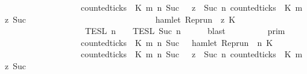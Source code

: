\begin{isabellebody}
\ \ \ \ \ \ \ \ \ \ \ \ \ \ \ \ {\isasyminter}\ {\isacharbraceleft}{\isasymrho}{\isachardot}\ {\isacharparenleft}counted{\isacharunderscore}ticks\ {\isasymrho}\ K\ m\ n\ {\isacharparenleft}Suc\ {}{\isacharparenright}\ {\isasymor}\ {\isacharparenleft}{\isasymforall}z\ {\isasymge}\ Suc\ n{\isachardot}\ {\isacharparenleft}counted{\isacharunderscore}ticks\ {\isasymrho}\ K\ m\ z\ {\isacharparenleft}Suc\ {}{\isacharparenright}{\isacharparenright}\isanewline
\ \ \ \ \ \ \ \ \ \ \ \ \ \ \ \ \ \ \ \ \ \ \ \ \ \ \ \ {\isasymlongrightarrow}\ hamlet\ {\isacharparenleft}{\isacharparenleft}Rep{\isacharunderscore}run\ {\isasymrho}{\isacharparenright}\ z\ K\ {\isacharbraceright}\isanewline
\ \ \ \ \ \ \ \ \ \ \ \ \ \ \ \ {\isasyminter}\ {\isasymlbrakk}{\isasymlbrakk}\ {\isasymPsi}\ {\isasymrbrakk}{\isasymrbrakk}\isactrlsub T\isactrlsub E\isactrlsub S\isactrlsub L\isactrlbsup {\isasymge}\ n\isactrlesup \ {\isasyminter}\ {\isasymlbrakk}{\isasymlbrakk}\ {\isasymPhi}\ {\isasymrbrakk}{\isasymrbrakk}\isactrlsub T\isactrlsub E\isactrlsub S\isactrlsub L\isactrlbsup {\isasymge}\ Suc\ n\isactrlesup {\isacartoucheclose}\isanewline
\ \ \ \ \isamarkupfalse%
\ blast\isanewline
\ \ \isamarkupfalse%
\ \isamarkupfalse%
\ {\isacartoucheopen}{\isachardot}{\isachardot}{\isachardot}\ {\isacharequal}\ {\isasymlbrakk}{\isasymlbrakk}\ {\isasymGamma}\ {\isasymrbrakk}{\isasymrbrakk}\isactrlsub p\isactrlsub r\isactrlsub i\isactrlsub m\ \isanewline
\ \ \ \ \ \ \ \ \ \ \ \ \ \ \ \ {\isasyminter}\ {\isacharbraceleft}{\isasymrho}{\isachardot}\ {\isacharparenleft}{\isasymnot}counted{\isacharunderscore}ticks\ {\isasymrho}\ K\ m\ n\ {\isacharparenleft}Suc\ {}{\isacharparenright}\ {\isasymor}\ hamlet\ {\isacharparenleft}{\isacharparenleft}Rep{\isacharunderscore}run\ {\isasymrho}{\isacharparenright}\ n\ K\isanewline
\ \ \ \ \ \ \ \ \ \ \ \ \ \ \ \ {\isasyminter}\ {\isacharbraceleft}{\isasymrho}{\isachardot}\ {\isacharparenleft}counted{\isacharunderscore}ticks\ {\isasymrho}\ K\ m\ n\ {\isacharparenleft}Suc\ {}{\isacharparenright}\ {\isasymor}\ {\isacharparenleft}{\isasymforall}z\ {\isasymge}\ Suc\ n{\isachardot}\ {\isacharparenleft}counted{\isacharunderscore}ticks\ {\isasymrho}\ K\ m\ z\ {\isacharparenleft}Suc\ {}{\isacharparenright}{\isacharparenright}\isanewline

\end{isabellebody}
